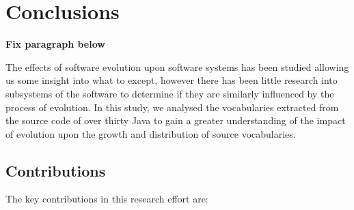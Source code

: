 
\chapter{Conclusions}
\label{chapter:Conclusion}

\textbf{Fix paragraph below}

The effects of software evolution upon software systems has been studied allowing us some insight into what to except, however there has been little research into subsystems of the software to determine if they are similarly influenced by the process of evolution. In this study, we analysed the vocabularies extracted from the source code of over thirty Java \OSYS to gain a greater understanding of the impact of evolution upon the growth and distribution of source vocabularies.

\section{Contributions} %
\label{sec:contributions}

The key contributions in this research effort are:

